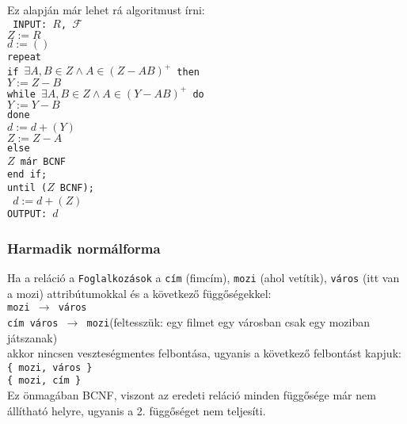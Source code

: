 \documentclass[fleqn,10pt,a4paper]{article}
\newcommand{\F}{\mathcal{F}}
\theoremstyle{magyar}
\begin{document}
  Ez alapján már lehet rá algoritmust írni:\\
  \texttt{
    \hspace*{0.3cm} INPUT: $R$, $\F$\\
    \hspace*{0.3cm} $Z:= R$\\
    \hspace*{0.3cm} $d := ()$\\
    \hspace*{0.3cm} repeat\\
    \hspace*{0.7cm} if $\exists A,B\in Z \land A \in (Z-AB)^+$ then\\
    \hspace*{1.4cm} $Y := Z -B$\\
    \hspace*{1.4cm} while $\exists A,B\in Z \land A \in (Y-AB)^+$ do\\
    \hspace*{2cm} $Y := Y - B$\\
    \hspace*{1.4cm} done\\
    \hspace*{1.4cm} $d := d + (Y)$\\
    \hspace*{1.4cm} $Z := Z - A$\\
    \hspace*{0.7cm} else\\
    \hspace*{1.4cm} $Z$ már BCNF\\
    \hspace*{0.7cm} end if;\\
    \hspace*{0.3cm} until ($Z$ BCNF);} \\
  \texttt{\hspace*{0.3cm} $d := d + (Z)$\\
    \hspace*{0.3cm} OUTPUT: $d$}
  
  \subsubsection{Harmadik normálforma}
  Ha a reláció a \texttt{Foglalkozások} a \texttt{cím} (fimcím), \texttt{mozi} (ahol vetítik), \texttt{város} (itt van a
  mozi) attribútumokkal és a következő függőségekkel:\\
  \texttt{mozi $\to$ város}\\
  \texttt{cím város $\to$ mozi}\quad (feltesszük: egy filmet egy városban csak egy moziban játszanak)\\
  akkor nincsen veszteségmentes felbontása, ugyanis a következő felbontást kapjuk:\\
  \texttt{\{ mozi, város \}}\\
  \texttt{\{ mozi, cím \}}\\
  Ez önmagában BCNF, viszont az eredeti reláció minden függősége már nem állítható helyre, ugyanis a 2. függőséget nem
  teljesíti.
  
\end{document}
